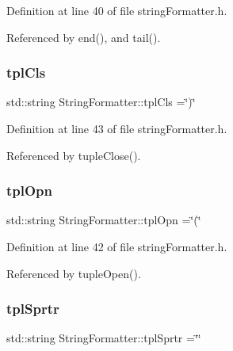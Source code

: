 Definition at line 40 of file string\+Formatter.\+h.



Referenced by end(), and tail().

\mbox{\label{classStringFormatter_a1866ee220b758acb9b435f5d60dbe840}} 
\subsubsection{\texorpdfstring{tpl\+Cls}{tplCls}}
{\footnotesize\ttfamily std\+::string String\+Formatter\+::tpl\+Cls =\char`\"{})\char`\"{}\hspace{0.3cm}{\ttfamily [private]}}



Definition at line 43 of file string\+Formatter.\+h.



Referenced by tuple\+Close().

\mbox{\label{classStringFormatter_a4845b9a05aad17819bb26d999e5c4b17}} 
\subsubsection{\texorpdfstring{tpl\+Opn}{tplOpn}}
{\footnotesize\ttfamily std\+::string String\+Formatter\+::tpl\+Opn =\char`\"{}(\char`\"{}\hspace{0.3cm}{\ttfamily [private]}}



Definition at line 42 of file string\+Formatter.\+h.



Referenced by tuple\+Open().

\mbox{\label{classStringFormatter_a7d7e47ef54cd20d27a1a56d29bcd98f5}} 
\subsubsection{\texorpdfstring{tpl\+Sprtr}{tplSprtr}}
{\footnotesize\ttfamily std\+::string String\+Formatter\+::tpl\+Sprtr =\char`\"{}\char`\"{}\hspace{0.3cm}{\ttfamily [private]}}



